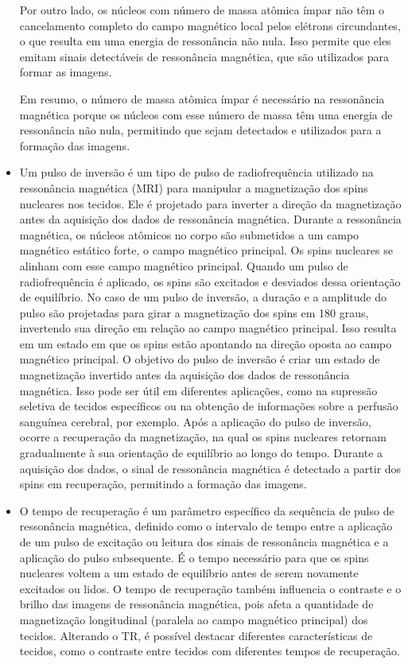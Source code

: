 \documentclass[11pt,a4paper]{article}
\newcounter{exemplo}
\begin{document}
\begin{exemplo}
\begin{itemize}
        Por outro lado, os núcleos com número de massa atômica ímpar não têm o cancelamento completo do campo magnético local pelos elétrons circundantes, o que resulta em uma energia de ressonância não nula. Isso permite que eles emitam sinais detectáveis de ressonância magnética, que são utilizados para formar as imagens.
        
        Em resumo, o número de massa atômica ímpar é necessário na ressonância magnética porque os núcleos com esse número de massa têm uma energia de ressonância não nula, permitindo que sejam detectados e utilizados para a formação das imagens.

        \item Um pulso de inversão é um tipo de pulso de radiofrequência utilizado na ressonância magnética (MRI) para manipular a magnetização dos spins nucleares nos tecidos. Ele é projetado para inverter a direção da magnetização antes da aquisição dos dados de ressonância magnética. Durante a ressonância magnética, os núcleos atômicos no corpo são submetidos a um campo magnético estático forte, o campo magnético principal. Os spins nucleares se alinham com esse campo magnético principal. Quando um pulso de radiofrequência é aplicado, os spins são excitados e desviados dessa orientação de equilíbrio. No caso de um pulso de inversão, a duração e a amplitude do pulso são projetadas para girar a magnetização dos spins em 180 graus, invertendo sua direção em relação ao campo magnético principal. Isso resulta em um estado em que os spins estão apontando na direção oposta ao campo magnético principal. O objetivo do pulso de inversão é criar um estado de magnetização invertido antes da aquisição dos dados de ressonância magnética. Isso pode ser útil em diferentes aplicações, como na supressão seletiva de tecidos específicos ou na obtenção de informações sobre a perfusão sanguínea cerebral, por exemplo. Após a aplicação do pulso de inversão, ocorre a recuperação da magnetização, na qual os spins nucleares retornam gradualmente à sua orientação de equilíbrio ao longo do tempo. Durante a aquisição dos dados, o sinal de ressonância magnética é detectado a partir dos spins em recuperação, permitindo a formação das imagens.
        
        \item O tempo de recuperação é um parâmetro específico da sequência de pulso de ressonância magnética, definido como o intervalo de tempo entre a aplicação de um pulso de excitação ou leitura dos sinais de ressonância magnética e a aplicação do pulso subsequente. É o tempo necessário para que os spins nucleares voltem a um estado de equilíbrio antes de serem novamente excitados ou lidos. O tempo de recuperação também influencia o contraste e o brilho das imagens de ressonância magnética, pois afeta a quantidade de magnetização longitudinal (paralela ao campo magnético principal) dos tecidos. Alterando o TR, é possível destacar diferentes características de tecidos, como o contraste entre tecidos com diferentes tempos de recuperação.
        

\end{itemize}
\end{exemplo}
\end{document}
